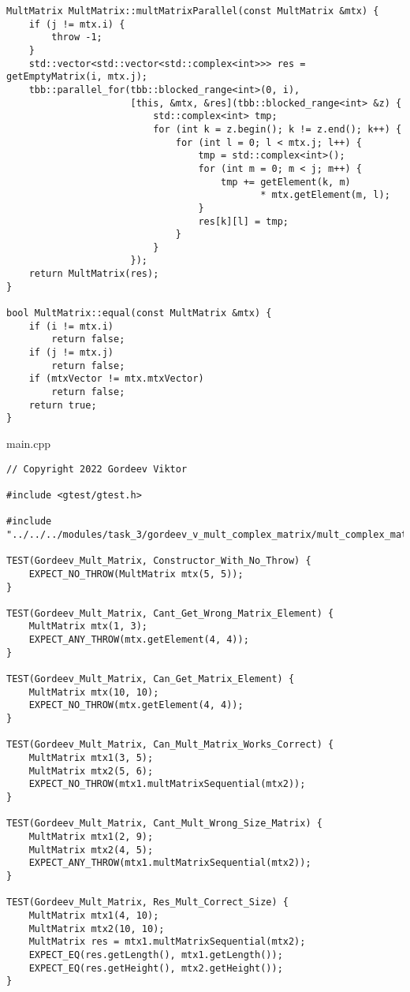 \documentclass{report}
\begin{document}
\begin{enumerate}
\begin{lstlisting}
MultMatrix MultMatrix::multMatrixParallel(const MultMatrix &mtx) {
    if (j != mtx.i) {
        throw -1;
    }
    std::vector<std::vector<std::complex<int>>> res = getEmptyMatrix(i, mtx.j);
    tbb::parallel_for(tbb::blocked_range<int>(0, i),
                      [this, &mtx, &res](tbb::blocked_range<int> &z) {
                          std::complex<int> tmp;
                          for (int k = z.begin(); k != z.end(); k++) {
                              for (int l = 0; l < mtx.j; l++) {
                                  tmp = std::complex<int>();
                                  for (int m = 0; m < j; m++) {
                                      tmp += getElement(k, m)
                                             * mtx.getElement(m, l);
                                  }
                                  res[k][l] = tmp;
                              }
                          }
                      });
    return MultMatrix(res);
}

bool MultMatrix::equal(const MultMatrix &mtx) {
    if (i != mtx.i)
        return false;
    if (j != mtx.j)
        return false;
    if (mtxVector != mtx.mtxVector)
        return false;
    return true;
}

\end{lstlisting}
main.cpp
\begin{lstlisting}
// Copyright 2022 Gordeev Viktor

#include <gtest/gtest.h>

#include "../../../modules/task_3/gordeev_v_mult_complex_matrix/mult_complex_matrix.h"

TEST(Gordeev_Mult_Matrix, Constructor_With_No_Throw) {
    EXPECT_NO_THROW(MultMatrix mtx(5, 5));
}

TEST(Gordeev_Mult_Matrix, Cant_Get_Wrong_Matrix_Element) {
    MultMatrix mtx(1, 3);
    EXPECT_ANY_THROW(mtx.getElement(4, 4));
}

TEST(Gordeev_Mult_Matrix, Can_Get_Matrix_Element) {
    MultMatrix mtx(10, 10);
    EXPECT_NO_THROW(mtx.getElement(4, 4));
}

TEST(Gordeev_Mult_Matrix, Can_Mult_Matrix_Works_Correct) {
    MultMatrix mtx1(3, 5);
    MultMatrix mtx2(5, 6);
    EXPECT_NO_THROW(mtx1.multMatrixSequential(mtx2));
}

TEST(Gordeev_Mult_Matrix, Cant_Mult_Wrong_Size_Matrix) {
    MultMatrix mtx1(2, 9);
    MultMatrix mtx2(4, 5);
    EXPECT_ANY_THROW(mtx1.multMatrixSequential(mtx2));
}

TEST(Gordeev_Mult_Matrix, Res_Mult_Correct_Size) {
    MultMatrix mtx1(4, 10);
    MultMatrix mtx2(10, 10);
    MultMatrix res = mtx1.multMatrixSequential(mtx2);
    EXPECT_EQ(res.getLength(), mtx1.getLength());
    EXPECT_EQ(res.getHeight(), mtx2.getHeight());
}


\end{lstlisting}
\end{enumerate}
\end{document}
